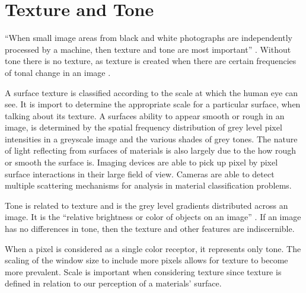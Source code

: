 \section{Texture and Tone}

“When small image areas from black and white photographs are independently processed by a machine, then texture and tone are most important” \cite{haralick}.  Without tone there is no texture, as texture is created when there are certain frequencies of tonal change in an image \cite{remotesensing}.

A surface texture is classified according to the scale at which the human eye can see.  It is import to determine the appropriate scale for a particular surface, when talking about its texture.  A surfaces ability to appear smooth or rough in an image, is determined by the spatial frequency distribution of grey level pixel intensities in a greyscale image and the various shades of grey tones.  The nature of light reflecting from surfaces of materials is also largely due to the how rough or smooth the surface is.  Imaging devices are able to pick up pixel by pixel surface interactions in their large field of view.  Cameras are able to detect multiple scattering mechanisms for analysis in material classification problems.

Tone is related to texture and is the grey level gradients distributed across an image.  It is the “relative brightness or color of objects on an image” \cite{remotesensing}.  If an image has no differences in tone, then the texture and other features are indiscernible.

When a pixel is considered as a single color receptor, it represents only tone.  The scaling of the window size to include more pixels allows for texture to become more prevalent.   Scale is important when considering texture since texture is defined in relation to our perception of a materials' surface.



